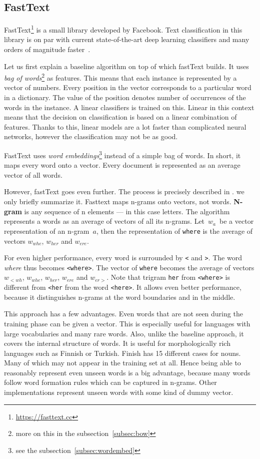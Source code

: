 \subsection{FastText}

FastText\footnote{\url{https://fasttext.cc}} is a small library developed by Facebook.
Text classification in this library is on par with current state-of-the-art deep learning classifiers
and many orders of magnitude faster~\citep{Joulin2017bag}.

Let us first explain a baseline algorithm on top of which fastText builds.
It uses {\it bag of words}\footnote{more on this in the subsection~\ref{subsec:bow}} as features.
This means that each instance is represented by a vector of numbers.
Every position in the vector corresponds to a particular word in a dictionary.
The value of the position denotes number of occurrences of the words in the instance.
A linear classifiers is trained on this.
Linear in this context means that the decision on classification is based on a linear combination of features.
Thanks to this, linear models are a lot faster than complicated neural networks, however the classification may not be as good.

FastText uses {\it word embeddings}\footnote{see the subsection~\ref{subsec:wordembed}} instead of a simple bag of words.
In short, it maps every word onto a vector. Every document is represented as an average vector of all words.

However, fastText goes even further.
The process is precisely described in \citet{Bojanowski2017enriching}.
we only briefly summarize it.
Fasttext maps n-grams onto vectors, not words.
{\bf N-gram} is any sequence of n elements --- in this case letters.
The algorithm represents a words as an average of vectors of all its n-grams.
Let~$w_{a}$~be a vector representation of an n-gram~$a$, then 
the representation of \texttt{where} is the average of vectors
$w_{whe}$, 
$w_{her}$ and
$w_{ere}$.

For even higher performance, every word is surrounded by \texttt{<} and \texttt{>}.
The word \textit{ where} thus becomes \texttt{<where>}.
The vector of \texttt{where} becomes the average of vectors
$w_{<wh}$, 
$w_{whe}$, 
$w_{her}$,
$w_{ere}$ and
$w_{er>}$.
Note that trigram {\tt her} from \texttt{<where>} is different from {\tt <her} from the word {\tt <here>}.
It allows even better performance, because it distinguishes n-grams at the word boundaries and in the middle.

This approach has a few advantages.
Even words that are not seen during the training phase can be given a vector.
This is especially useful for languages with large vocabularies and many rare words.
Also, unlike the baseline approach, it covers the internal structure of words.
It is useful for morphologically rich languages such as Finnish or Turkish.
Finish has 15 different cases for nouns.
Many of which may not appear in the training set at all.
Hence being able to reasonably represent even unseen words is a big advantage,
because many words follow word formation rules which can be captured in n-grams.
Other implementations represent unseen words with some kind of dummy vector.

